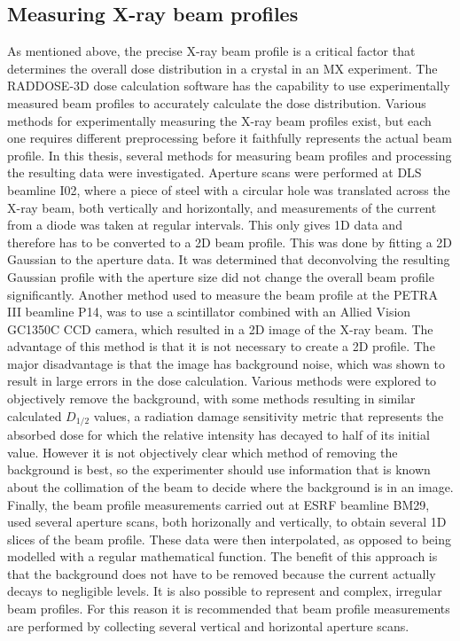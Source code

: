 \subsection{Measuring X-ray beam profiles}
\label{sub:Measuring X-ray Beam profiles}
As mentioned above, the precise X-ray beam profile is a critical factor that determines the overall dose distribution in a crystal in an MX experiment.
The RADDOSE-3D dose calculation software has the capability to use experimentally measured beam profiles to accurately calculate the dose distribution.
Various methods for experimentally measuring the X-ray beam profiles exist, but each one requires different preprocessing before it faithfully represents the actual beam profile.
In this thesis, several methods for measuring beam profiles and processing the resulting data were investigated.
Aperture scans were performed at DLS beamline I02, where a piece of steel with a circular hole was translated across the X-ray beam, both vertically and horizontally, and measurements of the current from a diode was taken at regular intervals.
This only gives 1D data and therefore has to be converted to a 2D beam profile.
This was done by fitting a 2D Gaussian to the aperture data.
It was determined that deconvolving the resulting Gaussian profile with the aperture size did not change the overall beam profile significantly.
Another method used to measure the beam profile at the PETRA III beamline P14, was to use a scintillator combined with an Allied Vision GC1350C CCD camera, which resulted in a 2D image of the X-ray beam.
The advantage of this method is that it is not necessary to create a 2D profile.
The major disadvantage is that the image has background noise, which was shown to result in large errors in the dose calculation.
Various methods were explored to objectively remove the background, with some methods resulting in similar calculated $D_{1/2}$ values, a radiation damage sensitivity metric that represents the absorbed dose for which the relative intensity has decayed to half of its initial value.
However it is not objectively clear which method of removing the background is best, so the experimenter should use information that is known about the collimation of the beam to decide where the background is in an image.
Finally, the beam profile measurements carried out at ESRF beamline BM29, used several aperture scans, both horizonally and vertically, to obtain several 1D slices of the beam profile.
These data were then interpolated, as opposed to being modelled with a regular mathematical function.
The benefit of this approach is that the background does not have to be removed because the current actually decays to negligible levels.
It is also possible to represent and complex, irregular beam profiles.
For this reason it is recommended that beam profile measurements are performed by collecting several vertical and horizontal aperture scans.

